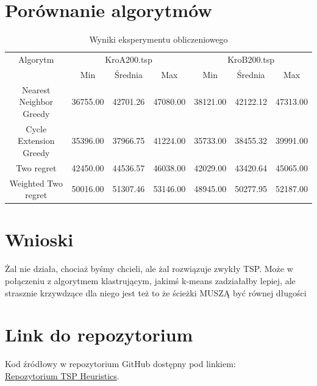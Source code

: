 \documentclass[11pt]{article}
\begin{document}
\section{Porównanie algorytmów}\label{sec:porównanie-algorytmów}
\begin{table}[H]
    \centering
    \begin{tabular}{|c||c|c|c||c|c|c|}
        \hline
        Algorytm & \multicolumn{3}{c||}{KroA200.tsp} & \multicolumn{3}{c|}{KroB200.tsp} \\
        \cline{2-4} \cline{5-7}
        & Min & Średnia & Max & Min & Średnia & Max   \\
        \hline
        Nearest Neighbor Greedy & 36755.00 & 42701.26 & 47080.00 & 38121.00 & 42122.12 & 47313.00 \\
        \hline
        Cycle Extension Greedy & 35396.00 & 37966.75 & 41224.00 & 35733.00 & 38455.32 &  39991.00 \\
        \hline
        Two regret & 42450.00 & 44536.57 & 46038.00 & 42029.00 & 43420.64 & 45065.00 \\
        \hline
        Weighted Two regret & 50016.00 & 51307.46 & 53146.00 & 48945.00 & 50277.95 & 52187.00 \\
        \hline
    \end{tabular}
    \label{tab:wyniki-eksperymentu}
    \caption{Wyniki eksperymentu obliczeniowego}
\end{table}

\section{Wnioski}\label{sec:wnioski}

Żal nie działa, chociaż byśmy chcieli, ale żal rozwiązuje zwykły TSP.
Może w połączeniu z algorytmem klastrującym, jakimś k-means zadziałałby lepiej, ale strasznie krzywdzące dla niego jest też to że ścieżki MUSZĄ być równej długości

\section{Link do repozytorium}\label{sec:link-do-repo}
Kod źródłowy w repozytorium GitHub dostępny pod linkiem: \\
\href{https://github.com/KotZPolibudy/PUT_IMO/tree/main/TSP_heuristic}{Repozytorium TSP Heuristics}.
\end{document}

